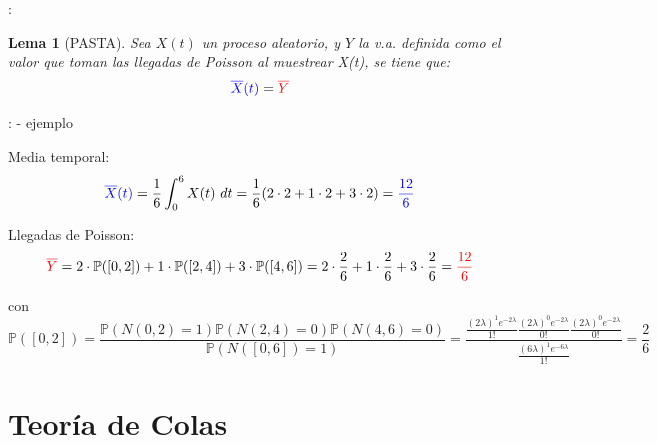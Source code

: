 \documentclass[xcolor={x11names}]{beamer}
\newtheorem{lema}{Lema}[section]
\newcommand{\red}[1]{{\color{red}#1}}
\newcommand{\blue}[1]{{\color{blue}#1}}
\begin{document}
\begin{frame}{\secname: \subsecname}
    \begin{lema}[PASTA]
        Sea \blue{$X(t)$} un proceso aleatorio,
        y \red{$Y$} la v.a. definida como el
        valor que toman las llegadas de Poisson
        al muestrear \blue{X(t)}, se tiene que:
        \begin{equation}
            \blue{\overline{X}(t)} = \red{\overline{Y}}
        \end{equation}
    \end{lema}
\end{frame}




\begin{frame}{\secname: \subsecname - ejemplo}

    Media temporal: 
    \begin{equation*}
        \blue{\overline{X}(t)}=\frac{1}{6}\int_0^6 X(t)\ dt =\frac{1}{6} (2\cdot2 + 1\cdot2 + 3\cdot2) = \blue{\frac{12}{6}}
    \end{equation*}

    Llegadas de Poisson:
    \begin{equation*}
        \red{\overline{Y}} = 2\cdot\mathbb{P}([0,2]) + 1 \cdot\mathbb{P}([2,4]) + 3\cdot \mathbb{P}([4,6])=2\cdot\frac{2}{6} + 1 \cdot\frac{2}{6}+ 3\cdot\frac{2}{6}=\red{\frac{12}{6}}
    \end{equation*}

    \vfill

    \begin{figure}
        \resizebox{.4\textwidth}{!}{%
        }
    \end{figure}

    \vfill

    con
    \begin{equation*}%
        \scriptstyle
        \mathbb{P}([0,2])=\frac{\mathbb{P}(N(0,2)=1)\mathbb{P}(N(2,4)=0)\mathbb{P}(N(4,6)=0)}{\mathbb{P}(N([0,6])=1)}
                          =\frac{\frac{(2\lambda)^1e^{-2\lambda}}{1!} \frac{(2\lambda)^0e^{-2\lambda}}{0!} \frac{(2\lambda)^0e^{-2\lambda}}{0!} }{\frac{(6\lambda)^1e^{-6\lambda}}{1!}}=\frac{2}{6}%
    \end{equation*}%
\end{frame}



\section{Teoría de Colas}
\end{document}
